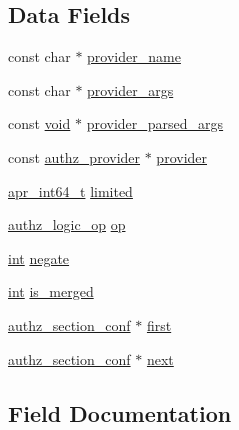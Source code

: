 \subsection*{Data Fields}
\begin{DoxyCompactItemize}
\item 
const char $\ast$ \hyperlink{structauthz__section__conf_a42abdb1f95405c4d592854bc5f9d4a59}{provider\+\_\+name}
\item 
const char $\ast$ \hyperlink{structauthz__section__conf_a129a6a2c5ae9c31d04bcbd489e585b35}{provider\+\_\+args}
\item 
const \hyperlink{group__MOD__ISAPI_gacd6cdbf73df3d9eed42fa493d9b621a6}{void} $\ast$ \hyperlink{structauthz__section__conf_a7b6b3996c49bb4bface31f44107a17ec}{provider\+\_\+parsed\+\_\+args}
\item 
const \hyperlink{structauthz__provider}{authz\+\_\+provider} $\ast$ \hyperlink{structauthz__section__conf_a253af1eecad7f065c49fa436036d055b}{provider}
\item 
\hyperlink{group__apr__platform_ga4b75afbf973dc6c8aea4ae75b044aa08}{apr\+\_\+int64\+\_\+t} \hyperlink{structauthz__section__conf_afc4e78e9cc2c857edfd5a664c99acf22}{limited}
\item 
\hyperlink{mod__authz__core_8c_a2f7ea245f9aec9f2a9caee7eced5c767}{authz\+\_\+logic\+\_\+op} \hyperlink{structauthz__section__conf_a62ca6dc629ba0f24388d22c350392c42}{op}
\item 
\hyperlink{pcre_8txt_a42dfa4ff673c82d8efe7144098fbc198}{int} \hyperlink{structauthz__section__conf_adc246f9ab6a1d757d8011c1aa0d302d4}{negate}
\item 
\hyperlink{pcre_8txt_a42dfa4ff673c82d8efe7144098fbc198}{int} \hyperlink{structauthz__section__conf_ab7cc9377f7b3846ad4f6aa130c15190e}{is\+\_\+merged}
\item 
\hyperlink{structauthz__section__conf}{authz\+\_\+section\+\_\+conf} $\ast$ \hyperlink{structauthz__section__conf_a7587ce2d84cd06d2f62544a7b8c0d008}{first}
\item 
\hyperlink{structauthz__section__conf}{authz\+\_\+section\+\_\+conf} $\ast$ \hyperlink{structauthz__section__conf_a9a35467a8a71f544c3e89bc1dc5c3ccb}{next}
\end{DoxyCompactItemize}


\subsection{Field Documentation}
